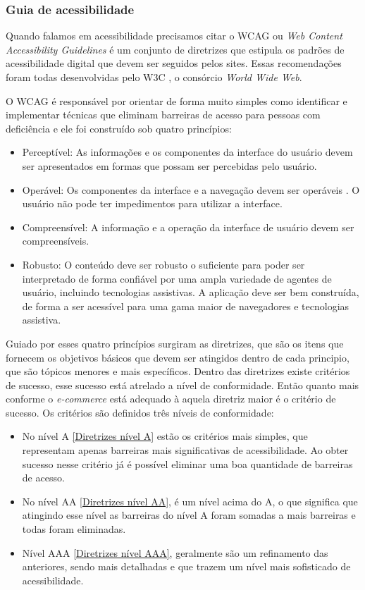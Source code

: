 \subsubsection{Guia de acessibilidade}
{
Quando falamos em acessibilidade precisamos citar o WCAG \cite{WCAG20} ou \textit{Web Content Accessibility Guidelines} é um conjunto de diretrizes que estipula os padrões de acessibilidade digital que devem ser seguidos pelos sites. Essas recomendações foram todas desenvolvidas pelo W3C \cite{W3C}, o consórcio \textit{World Wide Web}.

O WCAG \cite{WCAG21} é responsável por orientar de forma muito simples como identificar e implementar técnicas que eliminam barreiras de acesso para pessoas com deficiência e ele foi construído sob quatro princípios:
\begin{itemize}
\item Perceptível: As informações e os componentes da interface do usuário devem ser apresentados em formas que possam ser percebidas pelo usuário.\cite{WCAG20}
\item Operável: Os componentes da interface e a navegação devem ser operáveis \cite{WCAG20}. O usuário não pode ter impedimentos para utilizar a interface.
\item Compreensível: A informação e a operação da interface de usuário devem ser compreensíveis. \cite{WCAG20}
\item Robusto: O conteúdo deve ser robusto o suficiente para poder ser interpretado de forma confiável por uma ampla variedade de agentes de usuário, incluindo tecnologias assistivas. A aplicação deve ser bem construída, de forma a ser acessível para uma gama maior de navegadores e tecnologias assistiva.\cite{WCAG20}
\end{itemize}

Guiado por esses quatro princípios surgiram as diretrizes, que são os itens que fornecem os objetivos básicos que devem ser atingidos dentro de cada principio, que são tópicos menores e mais específicos. Dentro das diretrizes existe critérios de sucesso, esse sucesso está atrelado a nível de conformidade. Então quanto mais conforme o \textit{e-commerce} está adequado à aquela diretriz maior é o critério de sucesso. Os critérios são definidos três níveis de conformidade:
\begin{itemize}
    \item No nível A \ref{Diretrizes nível A} estão os critérios mais simples, que representam apenas barreiras mais significativas de acessibilidade. Ao obter sucesso nesse critério já é possível eliminar uma boa quantidade de barreiras de acesso. 
    \item No nível AA \ref{Diretrizes nível AA}, é um nível acima do A, o que significa que atingindo esse nível as barreiras do nível A foram somadas a mais barreiras e todas foram eliminadas.
    \item Nível AAA \ref{Diretrizes nível AAA}, geralmente são um refinamento das anteriores, sendo mais detalhadas e que trazem um nível mais sofisticado de acessibilidade.
\end{itemize}

}
